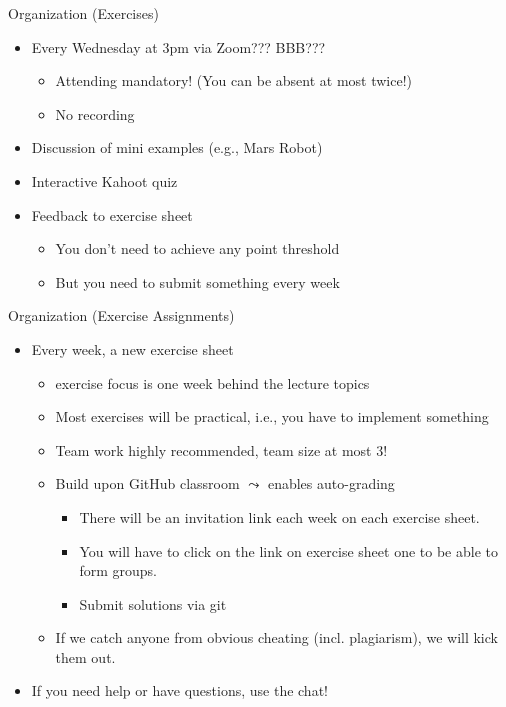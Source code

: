 \begin{frame}[c]{Organization (Exercises)}
	
	\begin{itemize}
		\item Every Wednesday at 3pm via Zoom??? BBB???
		\begin{itemize}
			\item Attending mandatory! (You can be absent at most twice!)
			\item No recording
		\end{itemize}
		\pause
		\item Discussion of mini examples (e.g., Mars Robot)
		\pause
		\item Interactive Kahoot quiz
		\pause
		\item Feedback to exercise sheet
		\begin{itemize}
			\item You don't need to achieve any point threshold
			\item But you need to submit something every week
		\end{itemize}
	
	\end{itemize}
	
\end{frame}
\begin{frame}[c]{Organization (Exercise Assignments)}
	
	\begin{itemize}
	\item Every week, a new exercise sheet
	\begin{itemize}
		\item exercise focus is one week behind the lecture topics
		\item Most exercises will be practical, i.e., you have to implement something
		\item Team work highly recommended, team size at most 3! 
		\pause
		\item Build upon GitHub classroom $\leadsto$ enables auto-grading
		\begin{itemize}
			\item There will be an invitation link each week on each exercise sheet.
			\item You will have to click on the link on exercise sheet one to be able to form groups.
			\item Submit solutions via git
		\end{itemize}
		\pause
		\item If we catch anyone from obvious cheating (incl. plagiarism), we will kick them out.
	\end{itemize}
	\pause
	\item \alert{If you need help or have questions, use the chat!}
	\end{itemize}
	
\end{frame}
